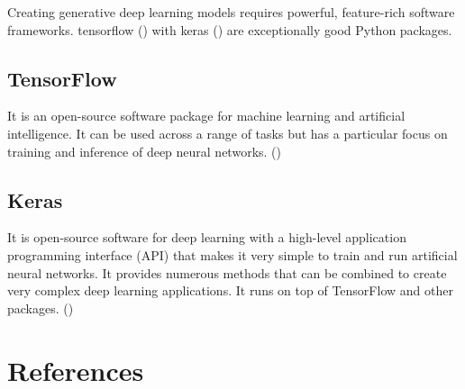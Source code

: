 \documentclass[10pt, letterpaper, twoside]{article}
\begin{document}
Creating generative deep learning models requires powerful, feature-rich software frameworks. \Gls{tensorflow} (\cite{tensorflow}) with \Gls{keras} (\cite{keras}) are exceptionally good Python packages.

\subsection{TensorFlow}\label{sec:tensorflow}

It is an open-source software package for machine learning and artificial intelligence. It can be used across a range of tasks but has a particular focus on training and inference of deep neural networks. (\cite{tensorflow})

\subsection{Keras}\label{sec:keras}

It is open-source software for deep learning with a  high-level application programming interface (API) that makes it very simple to train and run artificial neural networks. It provides numerous methods that can be combined to create very complex deep learning applications. It runs on top of TensorFlow and other packages. (\cite{keras})

\newpage
\printunsrtglossary[type={abbreviations}]
\newpage
\printunsrtglossary[style={indexgroup}]
\newpage
\section{References}\label{sec:references}
\printbibliography[heading=none]
\end{document}
